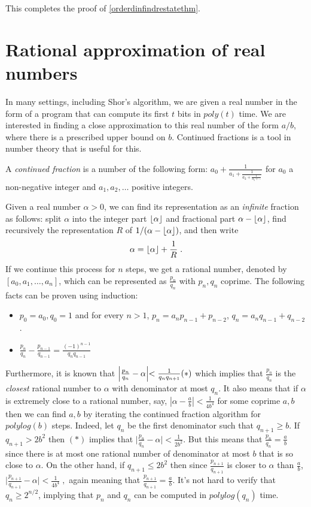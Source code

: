 This completes the proof of \cref{orderdinfindrestatethm}.

\section{Rational approximation of real
numbers}\label{Rational-approximation-of}

In many settings, including Shor's algorithm, we are given a real number
in the form of a program that can compute its first \(t\) bits in
\(poly(t)\) time. We are interested in finding a close approximation to
this real number of the form \(a/b\), where there is a prescribed upper
bound on \(b\). Continued fractions is a tool in number theory that is
useful for this.

A \emph{continued fraction} is a number of the following form:
\(a_0 + \frac{1}{a_1 + \frac{1}{a_2 + \tfrac{1}{a_3 + \ldots}} }\) for
\(a_0\) a non-negative integer and \(a_1,a_2,\ldots\) positive integers.

Given a real number \(\alpha>0\), we can find its representation as an
\emph{infinite} fraction as follows: split \(\alpha\) into the integer
part \(\lfloor \alpha \rfloor\) and fractional part \(\alpha - \lfloor \alpha \rfloor\),
find recursively the representation \(R\) of
\(1/(\alpha - \lfloor \alpha \rfloor)\), and then write
\[\alpha = \lfloor \alpha \rfloor + \frac{1}{R} \;.\] If we continue this
process for \(n\) steps, we get a rational number, denoted by
\([a_0,a_1,\ldots,a_n]\), which can be represented as
\(\tfrac{p_n}{q_n}\) with \(p_n,q_n\) coprime. The following facts can
be proven using induction:

\begin{itemize}
\item
  \(p_0=a_0, q_0 =1\) and for every \(n>1\),
  \(p_n = a_np_{n-1} + p_{n-2}\), \(q_n = a_nq_{n-1} + q_{n-2}\).
\item
  \(\tfrac{p_n}{q_n} - \tfrac{p_{n-1}}{q_{n-1}} = \tfrac{(-1)^{n-1}}{q_nq_{n-1}}\)
\end{itemize}

Furthermore, it is known that
\(\Bigl|\tfrac{p_n}{q_n} - \alpha\Bigl| < \tfrac{1}{q_nq_{n+1}} (*)\)
which implies that \(\tfrac{p_n}{q_n}\) is the \emph{closest} rational
number to \(\alpha\) with denominator at most \(q_n\). It also means
that if \(\alpha\) is extremely close to a rational number, say,
\(\left|\alpha - \tfrac{a}{b} \right| < \tfrac{1}{4b^4}\) for some
coprime \(a,b\) then we can find \(a,b\) by iterating the continued
fraction algorithm for \(polylog(b)\) steps. Indeed, let \(q_n\) be the
first denominator such that \(q_{n+1} \geq b\). If \(q_{n+1} > 2b^2\)
then \((*)\) implies that
\(\bigl|\tfrac{p_n}{q_n}-\alpha\bigr| < \tfrac{1}{2b^2}\). But this
means that \(\tfrac{p_n}{q_n} = \tfrac{a}{b}\) since there is at most
one rational number of denominator at most \(b\) that is so close to
\(\alpha\). On the other hand, if \(q_{n+1} \leq 2b^2\) then since
\(\tfrac{p_{n+1}}{q_{n+1}}\) is closer to \(\alpha\) than
\(\tfrac{a}{b}\),
\(\bigl|\tfrac{p_{n+1}}{q_{n+1}}-\alpha\bigr| < \tfrac{1}{4b^4}\;,\)
again meaning that \(\tfrac{p_{n+1}}{q_{n+1}}=\tfrac{a}{b}\). It's not
hard to verify that \(q_n \geq 2^{n/2}\), implying that \(p_n\) and
\(q_n\) can be computed in \(polylog(q_n)\) time.

